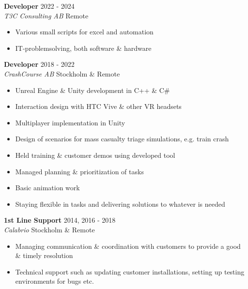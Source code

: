 \documentclass[a4paper]{article}
\begin{document}
\textbf{Developer} \hfill 2022 - 2024\\
\textit{T3C Consulting AB} \hfill Remote\\
\vspace{-1mm}
\begin{itemize} \itemsep 1pt
	\item Various small scripts for excel and automation
	\item IT-problemsolving, both software \& hardware
\end{itemize}
\vspace{1mm}
\textbf{Developer} \hfill 2018 - 2022\\
\textit{CrashCourse AB} \hfill Stockholm \& Remote\\
\vspace{-1mm}
\begin{itemize} \itemsep 1pt
	\item Unreal Engine \& Unity development in C++ \& C\#
	\item Interaction design with HTC Vive \& other VR headsets
    \item Multiplayer implementation in Unity
	\item Design of scenarios for mass casualty triage simulations, e.g. train crash
	\item Held training \& customer demos using developed tool
	\item Managed planning \& prioritization of tasks
	\item Basic animation work
    \item Staying flexible in tasks and delivering solutions to whatever is needed
\end{itemize}
\vspace{1mm}
\textbf{1st Line Support} \hfill 2014, 2016 - 2018\\
\textit{Calabrio} \hfill Stockholm \& Remote\\
\vspace{-1mm}
\begin{itemize} \itemsep 1pt
	\item Managing communication \& coordination with customers to provide a good \& timely resolution
	\item Technical support such as updating customer installations, setting up testing environments for bugs etc.
\end{itemize}
\vspace{8mm}
\ 
\end{document}
